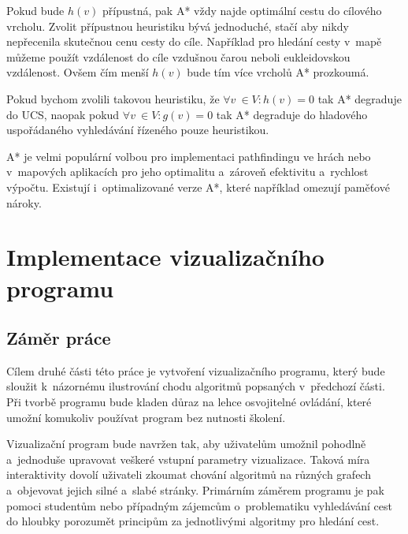 \documentclass[12pt]{report}			%
\begin{document}
			 
			
			Pokud bude $h(v)$ přípustná, pak A* vždy najde optimální cestu do cílového vrcholu.		
			 Zvolit přípustnou heuristiku bývá jednoduché, stačí aby nikdy nepřecenila skutečnou cenu cesty do cíle. Například pro hledání cesty v~mapě můžeme použít vzdálenost do cíle vzdušnou čarou neboli eukleidovskou vzdálenost. Ovšem čím menší $h(v)$ bude tím více vrcholů A* prozkoumá. 
			
			Pokud bychom zvolili takovou heuristiku, že $\forall v~\in V:h(v) = 0$ tak A* degraduje do UCS, naopak pokud $\forall v~\in V:g(v) = 0 $ tak A* degraduje do hladového uspořádaného vyhledávání řízeného pouze heuristikou.
			
			
			
			A* je velmi populární volbou pro implementaci pathfindingu ve hrách nebo v~mapových aplikacích pro jeho optimalitu a~zároveň efektivitu a~rychlost výpočtu. Existují i~optimalizované verze A*, které například omezují paměťové nároky.
			
			
			
	
	\part{Implementace vizualizačního programu}
		
		\chapter{Záměr práce}
			Cílem druhé části této práce je vytvoření vizualizačního programu, který bude sloužit k~názornému ilustrování chodu algoritmů popsaných v~předchozí části. Při tvorbě programu bude kladen důraz na lehce osvojitelné ovládání, které umožní komukoliv používat program bez nutnosti školení.
			
			Vizualizační program bude navržen tak, aby uživatelům umožnil pohodlně a~jednoduše upravovat veškeré vstupní parametry vizualizace. Taková míra interaktivity dovolí uživateli zkoumat chování algoritmů na různých grafech a~objevovat jejich silné a~slabé stránky.
			 Primárním záměrem programu je pak pomoci studentům nebo případným zájemcům o~problematiku vyhledávání cest do hloubky porozumět principům za jednotlivými algoritmy pro hledání cest.
			 
\end{document}
